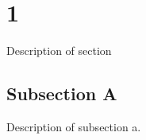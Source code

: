 \section{1}
\label{sect:A}
Description of section

\subsection{Subsection A}
Description of subsection a.
